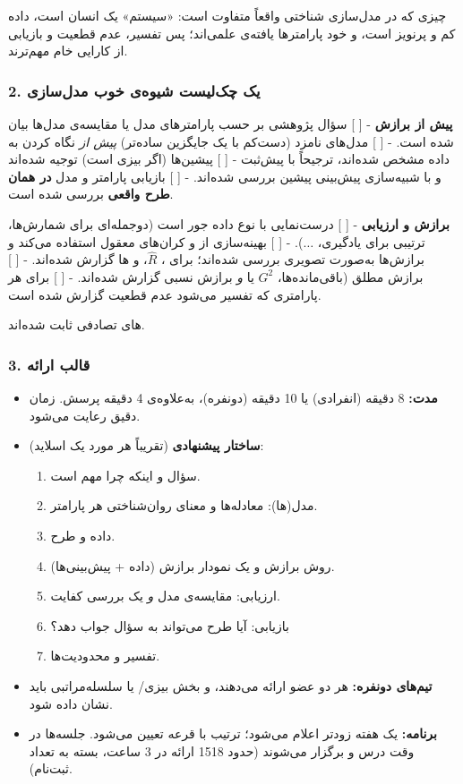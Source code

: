 چیزی که در مدل‌سازی شناختی واقعاً متفاوت است: «سیستم» یک انسان است، داده
کم و پرنویز است، و خود پارامترها یافته‌ی علمی‌اند؛ پس تفسیر، عدم قطعیت و
بازیابی از کارایی خام مهم‌ترند.

\subsubsection{2. یک چک‌لیست شیوه‌ی خوب مدل‌سازی}

\textbf{پیش از برازش} - {[} {]} سؤال پژوهشی بر حسب پارامترهای مدل یا
مقایسه‌ی مدل‌ها بیان شده است. - {[} {]} مدل‌های نامزد (دست‌کم با یک جایگزین
ساده‌تر) \emph{پیش از} نگاه کردن به داده مشخص شده‌اند، ترجیحاً با پیش‌ثبت
 - {[} {]} پیشین‌ها (اگر بیزی است) توجیه شده‌اند و
با شبیه‌سازی پیش‌بینی پیشین بررسی شده‌اند. - {[} {]} بازیابی پارامتر و مدل
\textbf{در همان طرح واقعی} بررسی شده است.

\textbf{برازش و ارزیابی} - {[} {]} درست‌نمایی با نوع داده جور است
(دوجمله‌ای برای شمارش‌ها، ترتیبی برای یادگیری، \ensuremath{\ldots}). - {[} {]}
بهینه‌سازی از  و کران‌های معقول استفاده می‌کند و برازش‌ها
به‌صورت تصویری بررسی شده‌اند؛ برای ، \(\hat R\)،  و
ها گزارش شده‌اند. - {[} {]} برازش مطلق (باقی‌مانده‌ها،
\(G^2\) یا  \emph{و} برازش نسبی  گزارش شده‌اند. -
{[} {]} برای هر پارامتری که تفسیر می‌شود عدم قطعیت گزارش شده است.

های تصادفی ثابت شده‌اند.

\subsubsection{3. قالب ارائه}

\begin{itemize}
\tightlist
\item
  \textbf{مدت:} 8 دقیقه (انفرادی) یا 10 دقیقه (دونفره)، به‌علاوه‌ی 4 دقیقه
  پرسش. زمان دقیق رعایت می‌شود.
\item
  \textbf{ساختار پیشنهادی} (تقریباً هر مورد یک اسلاید):

  \begin{enumerate}
  \def\labelenumi{\arabic{enumi}.}
  \tightlist
  \item
    سؤال و اینکه چرا مهم است.
  \item
    مدل(ها): معادله‌ها و معنای روان‌شناختی هر پارامتر.
  \item
    داده و طرح.
  \item
    روش برازش و یک نمودار برازش (داده + پیش‌بینی‌ها).
  \item
    ارزیابی: مقایسه‌ی مدل \emph{و} یک بررسی کفایت.
  \item
    بازیابی: آیا طرح می‌تواند به سؤال جواب دهد؟
  \item
    تفسیر و محدودیت‌ها.
  \end{enumerate}
\item
  \textbf{تیم‌های دونفره:} هر دو عضو ارائه می‌دهند، و بخش بیزی/
  یا سلسله‌مراتبی باید نشان داده شود.
\item
  \textbf{برنامه:} یک هفته زودتر اعلام می‌شود؛ ترتیب با قرعه تعیین می‌شود.
  جلسه‌ها در وقت درس و  برگزار می‌شوند (حدود 15\lr{--}18 ارائه در 3
  ساعت، بسته به تعداد ثبت‌نام).
\end{itemize}

